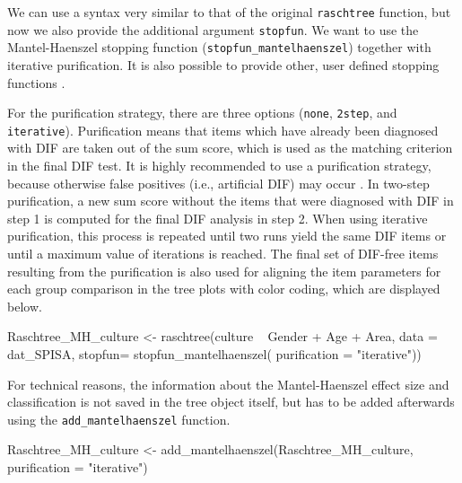 \documentclass[doc,floatsintext,natbib]{apa7}
\begin{document}
We can use a syntax very similar to that of the original \texttt{raschtree} function, but now we also provide the additional argument \texttt{stopfun}. We want to use the Mantel-Haenszel stopping function (\texttt{stopfun\_mantelhaenszel}) together with iterative purification. It is also possible to provide other, user defined stopping functions \citep[see][for details]{HennyDeba23}.

For the purification strategy, there are three options (\texttt{none}, \texttt{2step}, and \texttt{iterative}). Purification means that items which have already been diagnosed with DIF are taken out of the sum score, which is used as the matching criterion in the final DIF test. It is highly recommended to use a purification strategy, because otherwise false positives (i.e., artificial DIF) may occur \citep[cf., e.g.,][and the references therein]{DebStrZei:2022:CRC,HennyDeba23,Kopfetal:2015:EPM}. In two-step purification, a new sum score without the items that were diagnosed with DIF in step 1 is computed for the final DIF analysis in step 2. When using iterative purification, this process is repeated until two runs yield the same DIF items or until a maximum value of iterations is reached. 
The final set of DIF-free items resulting from the purification is also used for aligning the item parameters for each group comparison in the tree plots with color coding, which are displayed below.


\begin{Schunk}
\begin{Sinput}
 Raschtree_MH_culture <- raschtree(culture ~  Gender + Age + Area,
                                   data = dat_SPISA,
                                   stopfun= stopfun_mantelhaenszel(
                                     purification = "iterative"))
\end{Sinput}
\end{Schunk}

For technical reasons, the information about the Mantel-Haenszel effect size and classification is not saved in the tree object itself, but has to be added afterwards using the \texttt{add\_mantelhaenszel} function.

\begin{Schunk}
\begin{Sinput}
 Raschtree_MH_culture <- add_mantelhaenszel(Raschtree_MH_culture,
                                            purification = "iterative")
\end{Sinput}
\end{Schunk}
\end{document}
